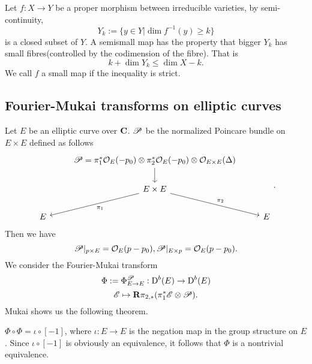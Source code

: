 \documentclass[../main.tex]{subfiles}
\begin{document}
\begin{remark}
Let $f:X\rightarrow Y$ be a proper morphism between irreducible varieties, by semi-continuity,
$$Y_{k}:=\{y\in Y|\dim f^{-1}(y)\geq k\}$$
is a closed subset of $Y$. A semismall map has the property that  bigger $Y_{k}$ has small fibres(controlled by the codimension of the fibre). That is 
$$k+\dim Y_{k}\leq \dim X-k.$$
We call $f$ a small map if the inequality is strict.
\end{remark}





\subsection{Fourier-Mukai transforms on elliptic curves}
Let $E$ be an elliptic curve over $\mathbf{C}$. $\mathscr{P}$ be the normalized Poincare bundle on $E\times E$ defined as follows
$$\begin{tikzcd}
 & \cP=\pi_{1}^{*}\O_{E}(-p_{0})\otimes \pi_{2}^{*}\O_{E}(-p_{0})\otimes \O_{E\times E}(\Delta)\arrow{d}&\\
 &E\times E\arrow{dl}{\pi_{1}}\arrow{dr}{\pi_{2}} &\\
  E& &E
\end{tikzcd}.$$
Then we have
$$\mathscr{P}|_{p\times E}=\mathcal{O}_{E}(p-p_{0}), \mathscr{P}|_{E\times p}=\mathcal{O}_{E}(p-p_{0}).$$
We consider the Fourier-Mukai transform
$$\Phi:=\Phi^{\mathscr{P}}_{E\rightarrow E}: \mathrm{D}^{b}(E)\rightarrow \mathrm{D}^{b}(E)$$
$$\mathscr{E}\mapsto \mathbf{R}\pi_{2, *}(\pi_{1}^{*}\mathscr{E}\otimes\mathscr{P} ).$$
Mukai shows us the following theorem.
\begin{theorem}[Mukai]$\Phi\circ\Phi=\iota\circ[-1]$, where $\iota: E\rightarrow E$ is the negation map in the group structure on $E$. Since $\iota\circ [-1]$ is obviously an equivalence, it follows that $\Phi$ is a nontrivial equivalence. 
\end{theorem}
\end{document}

